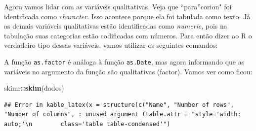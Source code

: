 \documentclass[
]{book}
\newenvironment{Shaded}{\begin{snugshade}}{\end{snugshade}}
\newcommand{\KeywordTok}[1]{\textcolor[rgb]{0.13,0.29,0.53}{\textbf{#1}}}
\newcommand{\NormalTok}[1]{#1}
\newcommand{\OperatorTok}[1]{\textcolor[rgb]{0.81,0.36,0.00}{\textbf{#1}}}
\newcommand{\StringTok}[1]{\textcolor[rgb]{0.31,0.60,0.02}{#1}}
\begin{document}
Agora vamos lidar com as variáveis qualitativas. Veja que ``para''corion" foi identificada como \emph{character}. Isso acontece porque ela foi tabulada como texto. Já as demais variáveis qualitativas estão identificadas como \emph{numeric}, pois na tabulação suas categorias estão codificadas com números. Para então dizer ao R o verdadeiro tipo dessas variáveis, vamos utilizar os seguintes comandos:

\begin{Shaded}
\end{Shaded}

A função \texttt{as.factor} é análoga à função \texttt{as.Date}, mas agora informando que as variáveis no argumento da função são qualitativas (factor). Vamos ver como ficou:

\begin{Shaded}
\begin{Highlighting}[]
\NormalTok{skimr}\OperatorTok{::}\KeywordTok{skim}\NormalTok{(dados)}
\end{Highlighting}
\end{Shaded}

\begin{verbatim}
## Error in kable_latex(x = structure(c("Name", "Number of rows", "Number of columns", : unused argument (table.attr = "style='width: auto;'\n        class='table table-condensed'")
\end{verbatim}
\end{document}
